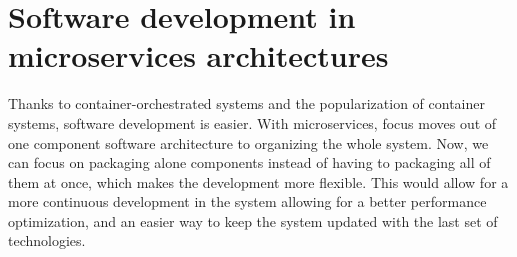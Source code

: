 \section{Software development in microservices architectures}
Thanks to container-orchestrated systems and the popularization of container systems, software development is easier. With microservices, focus moves out of one component software architecture to organizing the whole system. Now, we can focus on packaging alone components instead of having to packaging all of them at once, which makes the development more flexible. This would allow for a more continuous development in the system allowing for a better performance optimization, and an easier way to keep the system updated with the last set of technologies.
